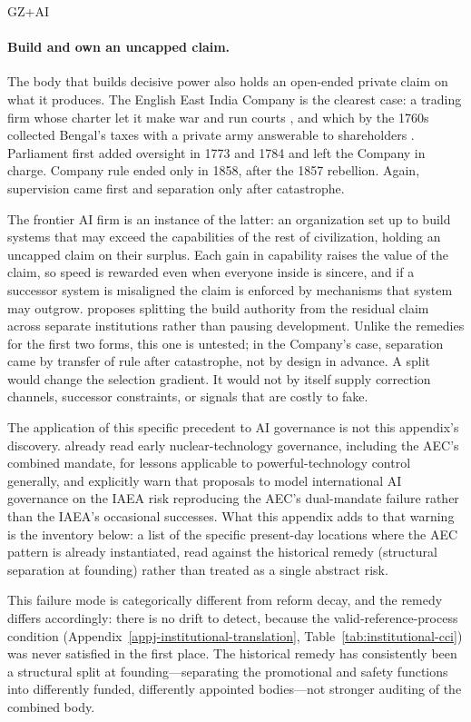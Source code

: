 \begin{refsection}
\begin{authbar}{GZ+AI}
\paragraph{Build and own an uncapped claim.} The body that builds decisive power also holds an open-ended private claim on what it produces. The English East India Company is the clearest case: a trading firm whose charter let it make war and run courts \autocite{stern2011companystate}, and which by the 1760s collected Bengal's taxes with a private army answerable to shareholders \autocite{dalrymple2019anarchy}. Parliament first added oversight in 1773 and 1784 and left the Company in charge. Company rule ended only in 1858, after the 1857 rebellion. Again, supervision came first and separation only after catastrophe.

The frontier AI firm is an instance of the latter: an organization set up to build systems that may exceed the capabilities of the rest of civilization, holding an uncapped claim on their surplus. Each gain in capability raises the value of the claim, so speed is rewarded even when everyone inside is sincere, and if a successor system is misaligned the claim is enforced by mechanisms that system may outgrow. \textcite{roko2026planr} proposes splitting the build authority from the residual claim across separate institutions rather than pausing development. Unlike the remedies for the first two forms, this one is untested; in the Company's case, separation came by transfer of rule after catastrophe, not by design in advance. A split would change the selection gradient. It would not by itself supply correction channels, successor constraints, or signals that are costly to fake.

The application of this specific precedent to AI governance is not this appendix's discovery. \textcite{zaidi2021baruch} already read early nuclear-technology governance, including the AEC's combined mandate, for lessons applicable to powerful-technology control generally, and \textcite{law2023dualmandate} explicitly warn that proposals to model international AI governance on the IAEA risk reproducing the AEC's dual-mandate failure rather than the IAEA's occasional successes. What this appendix adds to that warning is the inventory below: a list of the specific present-day locations where the AEC pattern is already instantiated, read against the historical remedy (structural separation at founding) rather than treated as a single abstract risk.

This failure mode is categorically different from reform decay, and the remedy differs accordingly: there is no drift to detect, because the valid-reference-process condition (Appendix~\ref{appj-institutional-translation}, Table~\ref{tab:institutional-cci}) was never satisfied in the first place. The historical remedy has consistently been a structural split at founding---separating the promotional and safety functions into differently funded, differently appointed bodies---not stronger auditing of the combined body.


\end{authbar}
\end{refsection}
